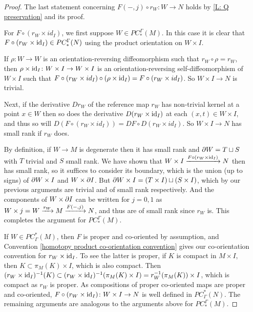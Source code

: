 \begin{proof}
	The last statement concerning $F(-,j) \circ r_W \colon W \to N$ holds by \cref{L: Q preservation} and its proof.

	For	$F \circ (r_W \times id_I)$, we first suppose $W \in PC_*^\Gamma(M)$.
	In this case it is clear that $F \circ (r_W \times \mathrm{id}_I) \in PC_*^\Gamma(N)$ using the product orientation on $W \times I$.

	If $\rho \colon W \to W$ is an orientation-reversing diffeomorphism such that $r_W \circ \rho = r_W$, then
	$\rho \times \mathrm{id}_I \colon W \times I \to W \times I$ is an orientation-reversing self-diffeomorphism of $W \times I$ such that $F \circ (r_W \times id_I) \circ (\rho \times \mathrm{id}_I) = F \circ (r_W \times id_I)$.
	So $W \times I \to N$ is trivial.

	Next, if the derivative $Dr_W$ of the reference map $r_W$ has non-trivial kernel at a point $x \in W$ then so does the derivative $D(r_W \times \mathrm{id}_I)$ at each $(x,t) \in W \times I$, and thus so
	will $D(F \circ (r_W \times id_I)) = DF \circ D(r_W \times id_I)$.
	So $W \times I \to N$ has small rank if $r_W$ does.

	By definition, if $W \to M$ is degenerate then it has small rank and $\partial W = T \sqcup S$ with $T$ trivial and $S$ small rank.
	We have shown that $W \times I \xrightarrow{F\circ(r_W\times\mathrm{id}_I)} N$ then has small rank, so it suffices to consider its boundary,
	which is the union (up to signs) of $\partial W \times I$ and $W \times \partial I$.
	But $\partial W \times I = (T \times I) \sqcup (S \times I)$, which by our previous
	arguments are trivial and of small rank respectively.
	And the components of $W \times \partial I$ can be written for $j = 0, 1$ as $W \times j = W \xrightarrow{r_W} M \xrightarrow{F(-,j)} N$, and thus are of small rank since $r_W$ is.
	This completes the argument for $PC_*^\Gamma(M)$.

	If $W \in PC^*_\Gamma(M)$, then $F$ is proper and co-oriented by assumption, and Convention \ref{homotopy product co-orientation convention} gives our co-orientation convention for $r_W \times \mathrm{id}_I$.
	To see the latter is proper, if $K$ is compact in $M \times I$, then $K \subset \pi_M(K) \times I$, which is also compact.
	Then $(r_W \times \mathrm{id}_I)^{-1}(K) \subset (r_W \times \mathrm{id}_I)^{-1}(\pi_M(K) \times I) = r_W^{-1}(\pi_M(K)) \times I$, which is compact as $r_W$ is proper.
	As compositions of proper co-oriented maps are proper and co-oriented, $F \circ (r_W \times \mathrm{id}_I) \colon W \times I \to N$ is well defined in $PC^*_\Gamma(N)$.
	The remaining arguments are analogous to the arguments above for $PC_*^\Gamma(M)$.
\end{proof}

